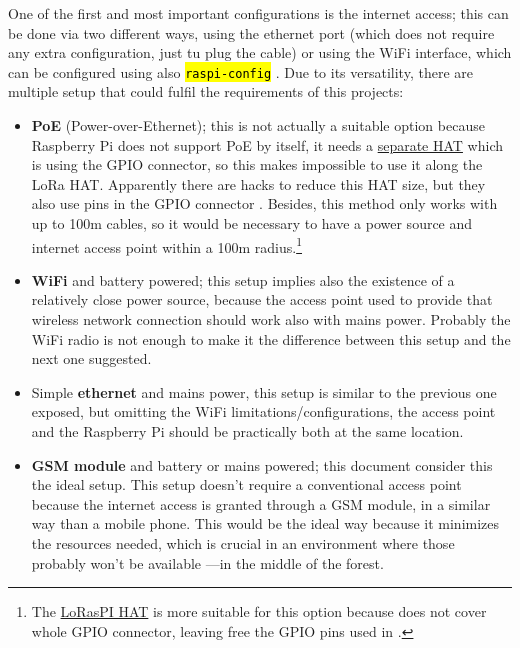 \documentclass[11pt,a4paper,dvipsnames,twoside]{article}
\newcommand{\cmd}[1] {\hl{\texttt{#1}}}
\begin{document}
One of the first and most important configurations is the internet access; this can be done via two different ways, using the ethernet port (which does not require any extra configuration, just tu plug the cable) or using the WiFi interface, which can be configured using also \cmd{raspi-config} \cite{RaspiWIFIcli}. Due to its versatility, there are multiple setup that could fulfil the requirements of this projects:

\begin{itemize}
  \item \textbf{PoE} (Power-over-Ethernet); this is not actually a suitable option because Raspberry Pi does not support PoE by itself, it needs a \href{https://www.raspberrypi.org/products/poe-hat/}{separate HAT} which is using the GPIO connector, so this makes impossible to use it along the LoRa HAT. Apparently there are hacks to reduce this HAT size, but they also use pins in the GPIO connector \cite{RaspiPoEHack}. Besides, this method only works with up to 100m cables, so it would be necessary to have a power source and internet access point within a 100m radius.\footnote{The \href{https://github.com/hallard/LoRasPI}{LoRasPI HAT} is more suitable for this option because does not cover whole GPIO connector, leaving free the GPIO pins used in \cite{RaspiPoEHack}.}
  \item \textbf{WiFi} and battery powered; this setup implies also the existence of a relatively close power source, because the access point used to provide that wireless network connection should work also with mains power. Probably the WiFi radio is not enough to make it the difference between this setup and the next one suggested.
  \item Simple \textbf{ethernet} and mains power, this setup is similar to the previous one exposed, but omitting the WiFi limitations/configurations, the access point and the Raspberry Pi should be practically both at the same location.
  \item \textbf{GSM module} and battery or mains powered; this document consider this the ideal setup. This setup doesn't require a conventional access point because the internet access is granted through a GSM module, in a similar way than a mobile phone. This would be the ideal way because it minimizes the resources needed, which is crucial in an environment where those probably won't be available ---in the middle of the forest.
  

\end{itemize}
\end{document}
